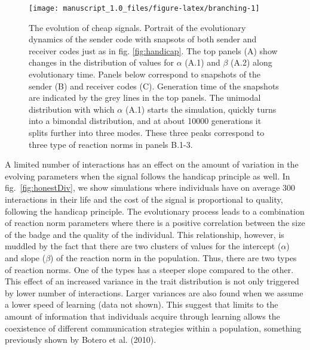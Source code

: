 \documentclass[
  12pt,
]{article}
\begin{document}
\begin{figure}

{\centering \texttt{[image: manuscript\_1.0\_files/figure-latex/branching-1]} 

}

\caption{The evolution of cheap signals. Portrait of the evolutionary dynamics of the sender code with snapsots of both sender and receiver codes just as in fig. \ref{fig:handicap}. The top panels (A) show changes in the distribution of values for $\alpha$ (A.1) and $\beta$ (A.2) along evolutionary time. Panels below correspond to snapshots of the sender (B) and receiver codes (C). Generation time of the snapshots are indicated by the grey lines in the top panels. The unimodal distribution with which $\alpha$ (A.1) starts the simulation, quickly turns into a bimondal distribution, and at about 10000 generations it splits further into three modes. These three peaks correspond to three type of reaction norms in panels B.1-3.}\label{fig:branching}
\end{figure}

A limited number of interactions has an effect on the amount of
variation in the evolving parameters when the signal follows the
handicap principle as well. In fig.~\ref{fig:honestDiv}, we show
simulations where individuals have on average 300 interactions in their
life and the cost of the signal is proportional to quality, following
the handicap principle. The evolutionary process leads to a combination
of reaction norm parameters where there is a positive correlation
between the size of the badge and the quality of the individual. This
relationship, however, is muddled by the fact that there are two
clusters of values for the intercept (\(\alpha\)) and slope (\(\beta\))
of the reaction norm in the population. Thus, there are two types of
reaction norms. One of the types has a steeper slope compared to the
other. This effect of an increased variance in the trait distribution is
not only triggered by lower number of interactions. Larger variances are
also found when we assume a lower speed of learning (data not shown).
This suggest that limits to the amount of information that individuals
acquire through learning allows the coexistence of different
communication strategies within a population, something previously shown
by Botero et al. (2010).
\end{document}

